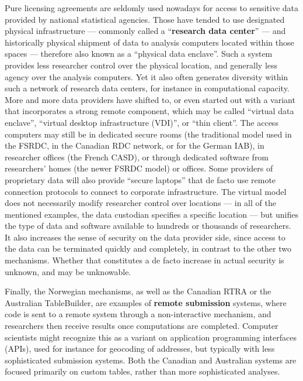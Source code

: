 Pure licensing agreements are seldomly used nowadays for access to sensitive data provided by national statistical agencies. Those have tended to use designated physical infrastructure --- commonly called a ``\textbf{research data center}'' --- and historically physical shipment of data to analysis computers located within those spaces \cite{currie2015social}  --- therefore also known as a ``physical data enclave''. Such a system provides less researcher control over the physical location, and generally less agency over the analysis computers. Yet it also often generates diversity within such a network of research data centers, for instance in computational capacity. More and more data providers have shifted to, or even started out with a variant that incorporates a strong remote component, which may be called ``virtual data enclave'', ``virtual desktop infrastructure (VDI)'', or ``thin client''. The access computers may still be in dedicated secure rooms (the traditional model used in the FSRDC, in the Canadian RDC network, or for the German \ac{IAB}), in researcher offices (the French \acf{CASD}), or through dedicated software from researchers' homes (the newer FSRDC model) or offices. Some providers of proprietary data will also provide ``secure laptops'' that de facto use remote connection protocols to connect to corporate infrastructure. The virtual model does not necessarily modify researcher control over locations --- in all of the mentioned examples, the data custodian specifies a specific location --- but unifies the type of data and software available to hundreds or thousands of researchers. It also increases the sense of security on the data provider side, since access to the data can be terminated quickly and completely, in contrast to the other two mechanisms. Whether that constitutes a de facto increase in actual security is unknown, and may be unknowable. 

Finally, the Norwegian mechanisms, as well as the Canadian RTRA \cite{statistics_canada_real_2021} or the Australian TableBuilder, are examples of \textbf{remote submission} systems, where code is sent to a remote system through a non-interactive mechanism, and researchers then receive results once computations are completed. Computer scientists might recognize this as a variant on application programming interfaces (APIs), used for instance for geocoding of addresses, but typically with less sophisticated submission systems. Both the Canadian and Australian systems are focused primarily on custom tables, rather than more sophisticated analyses.

